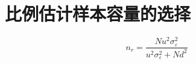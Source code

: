 \section{比例估计样本容量的选择}
\begin{equation*}
	n_r=\frac{Nu^2\sigma_\varepsilon^2}{u^2\sigma_\varepsilon^2+Nd^2}
\end{equation*}